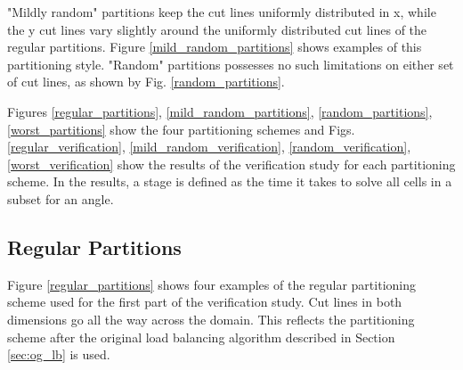 "Mildly random" partitions keep the cut lines uniformly distributed in x, while the y cut lines vary slightly around the uniformly distributed cut lines of the regular partitions. Figure \ref{mild_random_partitions} shows examples of this partitioning style. "Random" partitions possesses no such limitations on either set of cut lines, as shown by Fig. \ref{random_partitions}. 

Figures \ref{regular_partitions}, \ref{mild_random_partitions}, \ref{random_partitions}, \ref{worst_partitions} show the four partitioning schemes and Figs. \ref{regular_verification}, \ref{mild_random_verification}, \ref{random_verification}, \ref{worst_verification} show the results of the verification study for each partitioning scheme. In the results, a stage is defined as the time it takes to solve all cells in a subset for an angle.  

\subsection{Regular Partitions}

Figure \ref{regular_partitions} shows four examples of the regular partitioning scheme used for the first part of the verification study. Cut lines in both dimensions go all the way across the domain. This reflects the partitioning scheme after the original load balancing algorithm described in Section \ref{sec:og_lb} is used.

